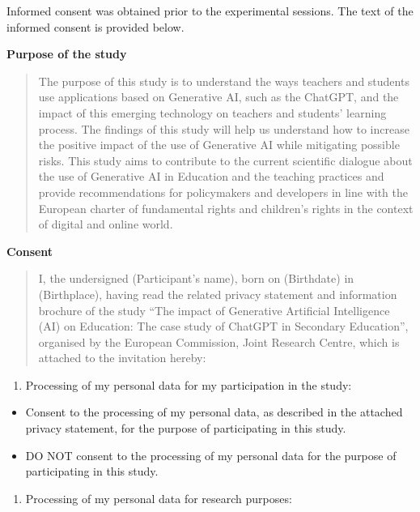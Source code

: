 \documentclass[
  11pt,
]{article}
\providecommand{\tightlist}{%
  \setlength{\itemsep}{0pt}\setlength{\parskip}{0pt}}
\begin{document}
Informed consent was obtained prior to the experimental sessions. The text of the informed consent is provided below.

\textbf{Purpose of the study}

\begin{quote}
The purpose of this study is to understand the ways teachers and students use applications based on Generative AI, such as the ChatGPT, and the impact of this emerging technology on teachers and students' learning process. The findings of this study will help us understand how to increase the positive impact of the use of Generative AI while mitigating possible risks. This study aims to contribute to the current scientific dialogue about the use of Generative AI in Education and the teaching practices and provide recommendations for policymakers and developers in line with the European charter of fundamental rights and children's rights in the context of digital and online world.
\end{quote}

\textbf{Consent}

\begin{quote}
I, the undersigned (Participant's name), born on (Birthdate) in (Birthplace), having read the related privacy statement and information brochure of the study ``The impact of Generative Artificial Intelligence (AI) on Education: The case study of ChatGPT in Secondary Education'', organised by the European Commission, Joint Research Centre, which is attached to the invitation hereby:
\end{quote}

\begin{enumerate}
\def\labelenumi{(\arabic{enumi})}
\tightlist
\item
  Processing of my personal data for my participation in the study:
\end{enumerate}

\begin{itemize}
\tightlist
\item[$\square$]
  Consent to the processing of my personal data, as described in the attached privacy statement, for the purpose of participating in this study.
\item[$\square$]
  DO NOT consent to the processing of my personal data for the purpose of participating in this study.
\end{itemize}

\begin{enumerate}
\def\labelenumi{(\arabic{enumi})}
\setcounter{enumi}{1}
\tightlist
\item
  Processing of my personal data for research purposes:
\end{enumerate}
\end{document}
